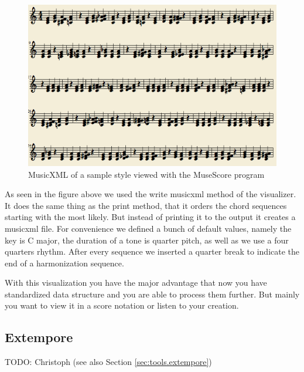 \begin{figure}[ht]
\includegraphics[scale=.5]{Chapters/pic/xml_print.png}
\caption{MusicXML of a sample style viewed with the MuseScore program}
\end{figure}

As seen in the figure above we used the write musicxml method of the visualizer. It does the same thing as the print method, that it orders the chord sequences starting with the most likely. But instead of printing it to the output it creates a musicxml file. For convenience we defined a bunch of default values, namely the key is C major, the duration of a tone is quarter pitch, as well as we use a four quarters rhythm. After every sequence we inserted a quarter break to indicate the end of a harmonization sequence.

With this visualization you have the major advantage that now you have standardized data structure and you are able to process them further. But mainly you want to view it in a score notation or listen to your creation.

\subsection{Extempore}
\label{sec:viewers.extempore}

TODO: Christoph (see also Section \ref{sec:tools.extempore})